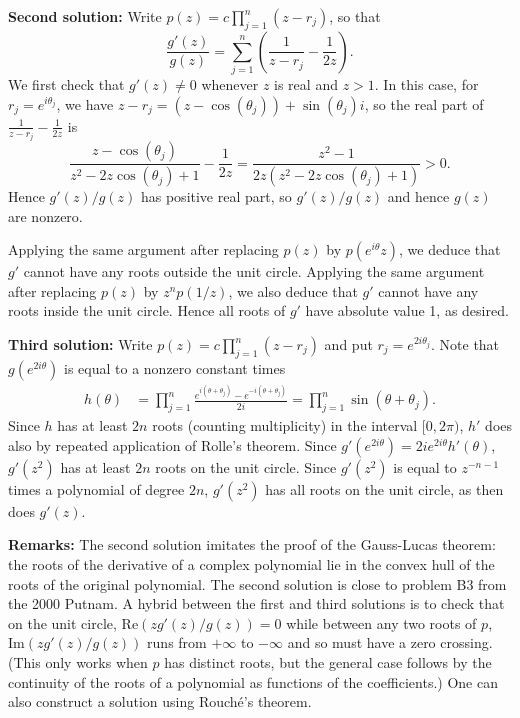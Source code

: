 \documentclass[amssymb,twocolumn,pra,10pt,aps]{revtex4-1}
\begin{document}
\begin{itemize}
\textbf{Second solution:}
Write $p(z) = c\prod_{j=1}^n (z-r_j)$, so that
\[
\frac{g'(z)}{g(z)}
= \sum_{j=1}^n \left( \frac{1}{z-r_j} - \frac{1}{2z} \right).
\]
We first check that $g'(z) \neq 0$ whenever $z$ is real and $z>1$.
In this case, for $r_j = e^{i \theta_j}$, we have $z - r_j =
(z - \cos (\theta_j)) + \sin(\theta_j) i$, so the real part of
$\frac{1}{z-r_j} - \frac{1}{2z}$ is
\[
\frac{z - \cos(\theta_j)}{z^2 - 2z \cos(\theta_j) + 1} - \frac{1}{2z}
= \frac{z^2-1}{2z(z^2 - 2z \cos(\theta_j) + 1)} > 0.
\]
Hence $g'(z)/g(z)$ has positive real part, so $g'(z)/g(z)$ and hence
$g(z)$ are nonzero.

Applying the same argument after replacing $p(z)$ by $p(e^{i \theta} z)$,
we deduce that $g'$ cannot have any roots outside the unit circle.
Applying the same argument after replacing $p(z)$ by $z^n p(1/z)$, we
also deduce that $g'$ cannot have any roots inside the unit circle.
Hence all roots of $g'$ have absolute value 1, as desired.

\textbf{Third solution:}
Write $p(z) = c \prod_{j=1}^n (z - r_j)$ and
put $r_j = e^{2 i \theta_j}$. Note that $g(e^{2 i \theta})$
is equal to a nonzero constant times
\begin{align*}
h(\theta) &= \prod_{j=1}^n \frac{e^{i (\theta + \theta_j)}
- e^{-i(\theta + \theta_j)}}{2i} = \prod_{j=1}^n \sin(\theta +\theta_j).
\end{align*}
Since $h$ has at least $2n$ roots (counting multiplicity)
in the interval $[0, 2\pi)$, $h'$ does also by repeated application of
Rolle's theorem. Since $g'(e^{2 i \theta}) = 2i e^{2i \theta} h'(\theta)$,
$g'(z^2)$ has at least $2n$ roots on the unit circle. Since $g'(z^2)$ is equal to
$z^{-n-1}$ times a polynomial of degree $2n$, $g'(z^2)$ has all roots on the
unit circle, as then does $g'(z)$.

\textbf{Remarks:}
The second solution imitates the proof of the Gauss-Lucas theorem:
the roots of the derivative of a complex polynomial lie in the convex hull of
the roots of the original polynomial.
The second solution is close to problem B3 from the 2000 Putnam.
A hybrid between the first and third solutions is to check that
on the unit circle, $\mathrm{Re}(zg'(z)/g(z)) = 0$ while between any
two roots of $p$, $\mathrm{Im}(zg'(z)/g(z))$ runs from $+\infty$ to $-\infty$
and so must have a zero crossing. (This only works when $p$ has distinct roots,
but the general case follows by the continuity of the roots of a polynomial
as functions of the coefficients.)
One can also construct a  solution using Rouch\'e's theorem.


\end{itemize}
\end{document}
